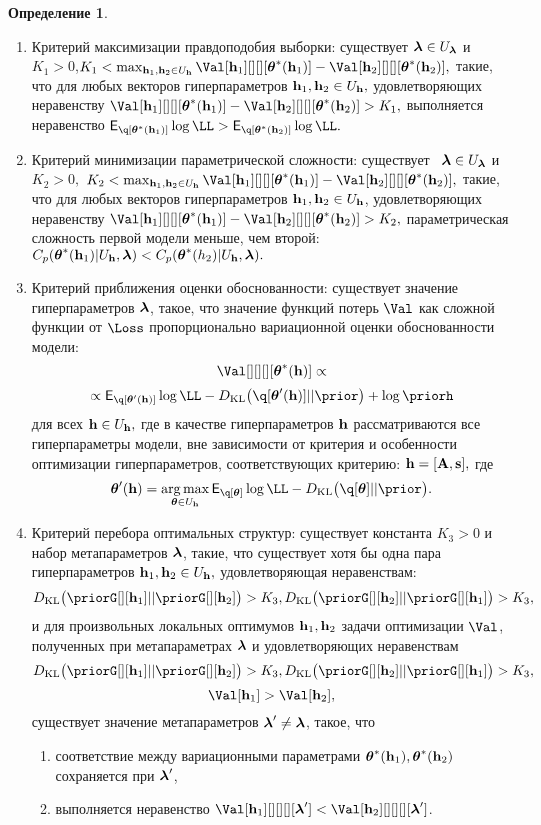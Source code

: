 \documentclass[11pt, a5paper]{dissert}
\theoremstyle{definition}
\newtheorem{defin}{Определение}
\DeclareMathOperator*{\argmax}{arg\,max}
\begin{document}
{\begin{defin}
\begin{enumerate}
\item Критерий максимизации правдоподобия выборки: существует $\boldsymbol{\lambda} \in U_{\boldsymbol{\lambda}}$ и  $K_1>0$,$K_1 < \max_{\h_1,\h_2 \in \Uh} \Val[\h_1][][][\teta^{*}(\h_1)] - \Val[\h_2][][][\teta^{*}(\h_2)],$ такие, что для любых векторов гиперпараметров $\mathbf{h}_1, \mathbf{h}_2 \in U_{\mathbf{h}},$ удовлетворяющих неравенству $\Val[\h_1][][][\teta^{*}(\h_1)] - \Val[\h_2][][][\teta^{*}(\h_2)] > K_1,$ выполняется неравенство $\E_{\q[\teta^{*}(\h_1)]}\log\LL > \E_{\q[\teta^{*}(\h_2)]}\log\LL.$

\item Критерий минимизации параметрической сложности:  существует  $\boldsymbol{\lambda} \in U_{\boldsymbol{\lambda}}$ и $K_2>0,$ $K_2 < \max_{\h_1, \h_2 \in \Uh} \Val[\h_1][][][\teta^{*}(\h_1)] - \Val[\h_2][][][\teta^{*}(\h_2)],$ такие, что для любых векторов гиперпараметров $\mathbf{h}_1,\mathbf{h}_2 \in U_{\mathbf{h}}$, удовлетворяющих неравенству $\Val[\h_1][][][\teta^{*}(\h_1)] - \Val[\h_2][][][\teta^{*}(\h_2)]>K_2,$ параметрическая сложность первой модели меньше, чем второй: $C_p(\boldsymbol{\theta}^{*}(\mathbf{h}_1)|U_{\mathbf{h}},\boldsymbol{\lambda})<C_p(\boldsymbol{\theta}^{*}(h_2)|U_{\mathbf{h}},\boldsymbol{\lambda}).$

\item Критерий приближения оценки обоснованности: существует значение гиперпараметров $\boldsymbol{\lambda}$, такое, что значение функций потерь $\Val$ как сложной функции от $\Loss$ пропорционально вариационной оценки обоснованности модели: $$\Val[][][][\teta^{*}(\h)] \propto $$
$$\propto
\E_{\q[\teta'(\h)]}\log\LL - \KL{\q[\teta'(\h)]}{\prior} + \log\priorh$$ для всех $\mathbf{h} \in U_{\mathbf{h}},$
где в качестве гиперпараметров $\mathbf{h}$ рассматриваются все гиперпараметры модели, вне зависимости от критерия и особенности оптимизации гиперпараметров, соответствующих критерию: $\mathbf{h} = [\mathbf{A}, \mathbf{s}],$
где $$\teta'(\h) = \argmax_{\teta \in \Uh} \E_{\q[\teta]}\log\LL - \KL{\q[\teta]}{\prior}.$$

\item Критерий перебора оптимальных структур: существует константа $K_3>0$ и набор метапараметров $\boldsymbol{\lambda}$, такие, что существует хотя бы одна пара гиперпараметров $\mathbf{h}_1, \mathbf{h}_2 \in U_{\mathbf{h}},$ удовлетворяющая неравенствам:
$$\KL{\priorG[][\h_1]}{\priorG[][\h_2]} > K_3,\KL{\priorG[][\h_2]}{\priorG[][\h_1]}>K_3,$$ и для произвольных локальных оптимумов  $\mathbf{h}_1,\mathbf{h}_2$ задачи оптимизации $\Val$, полученных при метапараметрах $\boldsymbol{\lambda}$ и удовлетворяющих неравенствам $$\KL{\priorG[][\h_1]}{\priorG[][\h_2]} > K_3, \KL{\priorG[][\h_2]}{\priorG[][\h_1]}>K_3,$$$$\Val[\h_1] > \Val[\h_2],$$  существует значение метапараметров $\boldsymbol{\lambda}' \neq \boldsymbol{\lambda}$, такое, что
\begin{enumerate}
\item соответствие между вариационными параметрами $\boldsymbol{\theta}^{*}(\mathbf{h}_1),\boldsymbol{\theta}^{*}(\mathbf{h}_2)$ сохраняется при  $\boldsymbol{\lambda}'$,
\item выполняется неравенство $\Val[\h_1][][][][\lam'] < \Val[\h_2][][][][\lam']$.
\end{enumerate}



\end{enumerate}
\end{defin}}
\end{document}
